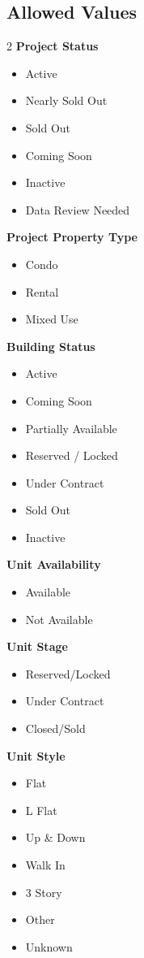 \documentclass[10pt]{article}
\begin{document}
\subsection{Allowed Values}
\begin{multicols}{2}
\textbf{Project Status}
\begin{itemize}
\item Active
\item Nearly Sold Out
\item Sold Out
\item Coming Soon
\item Inactive
\item Data Review Needed
\end{itemize}

\textbf{Project Property Type}
\begin{itemize}
\item Condo
\item Rental
\item Mixed Use
\end{itemize}

\textbf{Building Status}
\begin{itemize}
\item Active
\item Coming Soon
\item Partially Available
\item Reserved / Locked
\item Under Contract
\item Sold Out
\item Inactive
\end{itemize}

\textbf{Unit Availability}
\begin{itemize}
\item Available
\item Not Available
\end{itemize}

\textbf{Unit Stage}
\begin{itemize}
\item Reserved/Locked
\item Under Contract
\item Closed/Sold
\end{itemize}

\textbf{Unit Style}
\begin{itemize}
\item Flat
\item L Flat
\item Up \& Down
\item Walk In
\item 3 Story
\item Other
\item Unknown
\end{itemize}
\end{multicols}
\end{document}
